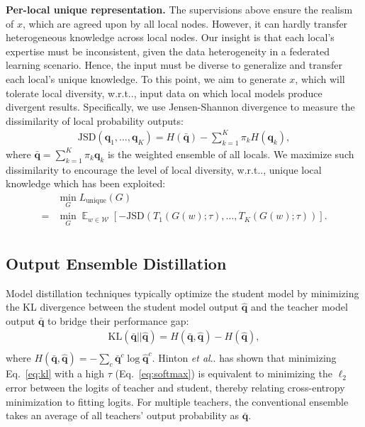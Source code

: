 \documentclass[letterpaper]{article} %
\makeatletter
\DeclareRobustCommand\onedot{\futurelet\@let@token\@onedot}
\def\@onedot{\ifx\@let@token.\else.\null\fi\xspace}
\DeclareMathOperator*{\fe}{\mathbb{E}}
\def\wrt{w.r.t\onedot} \def\dof{d.o.f\onedot}
\def\etal{\emph{et al}\onedot}
\newcommand{\domw}{\mathcal{W}}
\makeatother
\begin{document}
\textbf{Per-local unique representation.}
The supervisions above ensure the realism of $x$, which are agreed upon by all local nodes. However, it can hardly transfer heterogeneous knowledge across local nodes. Our insight is that each local's expertise must be inconsistent, given the data heterogeneity in a federated learning scenario. Hence, the input must be diverse to generalize and transfer each local's unique knowledge.
To this point, we aim to generate $x$, which will tolerate local diversity, \wrt, input data on which local models produce divergent results. Specifically, we use Jensen-Shannon divergence to measure the dissimilarity of local probability outputs:
\begin{equation}
\label{eq:jsd}
    \begin{aligned}
        \text{JSD}(\bm{q}_1, \dots, \bm{q}_K) = H(\bar{\bm{q}}) - \sum_{k=1}^K \pi_k H(\bm{q}_k),
    \end{aligned}
\end{equation}
where $\bar{\bm{q}} = \sum_{k=1}^{K} \pi_k \bm{q}_k$ is the weighted ensemble of all locals.
We maximize such dissimilarity to encourage the level of local diversity, \wrt, unique local knowledge which has been exploited:
\begin{equation}
\label{eq:uniqueloss}
\begin{aligned}
    &\min_{G} L_\text{unique} (G) \\
    = & \min_{G} \fe_{w \in \domw} [-\text{JSD}(T_1(G(w); \tau), \dots, T_K(G(w); \tau)) ].\\
\end{aligned}
\end{equation}

\subsection{Output Ensemble Distillation}
Model distillation techniques typically optimize the student model by minimizing the KL divergence between the student model output $\hat{\bm{q}}$ and the teacher model output $\bar{\bm{q}}$ to bridge their performance gap:
\begin{equation}
\label{eq:kl}
\begin{aligned}
    \text{KL}(\bar{\bm{q}}|| \hat{\bm{q}}) = H(\bar{\bm{q}},\hat{\bm{q}}) - H(\hat{\bm{q}}),  \\
\end{aligned}
\end{equation}
where $H(\bar{\bm{q}}, \hat{\bm{q}})=-\sum_c \bar{\bm{q}}^c \log \hat{\bm{q}}^c$. Hinton \etal \cite{hinton2015distilling} has shown that minimizing Eq.~\ref{eq:kl} with a high $\tau$ (Eq.~\ref{eq:softmax}) is equivalent to minimizing the $\ell_2$ error between the logits of teacher and student, thereby relating cross-entropy minimization to fitting logits.  For multiple teachers, the conventional ensemble takes an average of all teachers' output probability as $\bar{\bm{q}}$.
\end{document}
